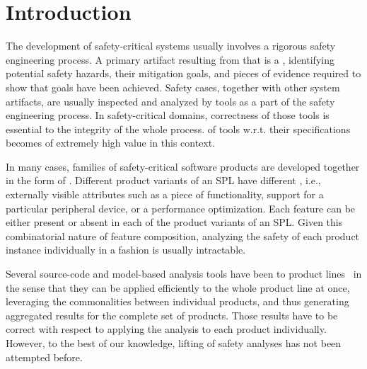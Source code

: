 \vspace{-0.2in}
\section{Introduction}
\label{sec:intro}
\vspace{-0.1in}
The development of safety-critical systems usually involves a rigorous safety engineering process. A primary artifact resulting from that is a , identifying potential safety hazards, their mitigation goals, and pieces of evidence required to show that goals have been achieved.
Safety cases, together with other system artifacts, are usually inspected and analyzed by tools as a part of the safety engineering process. In safety-critical domains, correctness of those tools is essential to the integrity of the whole process.  of tools w.r.t. their specifications becomes of extremely high value in this context.

In many cases, families of safety-critical software products are developed together in the form of  . Different product variants of an SPL have different , i.e., externally visible attributes such
as a piece of functionality, support for a particular peripheral device, or a performance optimization. Each feature can be either present or absent in each of the product variants of an SPL.
Given this combinatorial nature of feature composition, 
analyzing the safety of each product instance individually in a  fashion is usually intractable. 

Several source-code and model-based analysis tools have been  to product lines~\cite{Thum:2014,Kastner:2012,Gazzillo:2012,Salay:2014,Bodden:2013,Classen:2013,Shahin:2019,Shahin:2020} in the sense that they can be applied efficiently to the whole product line at once, leveraging the commonalities between individual products, and thus generating aggregated results for the complete set of products. Those results have to be correct with respect to applying the analysis to each product individually. 
However, to the best of our knowledge, lifting of safety analyses has not been attempted before. 

